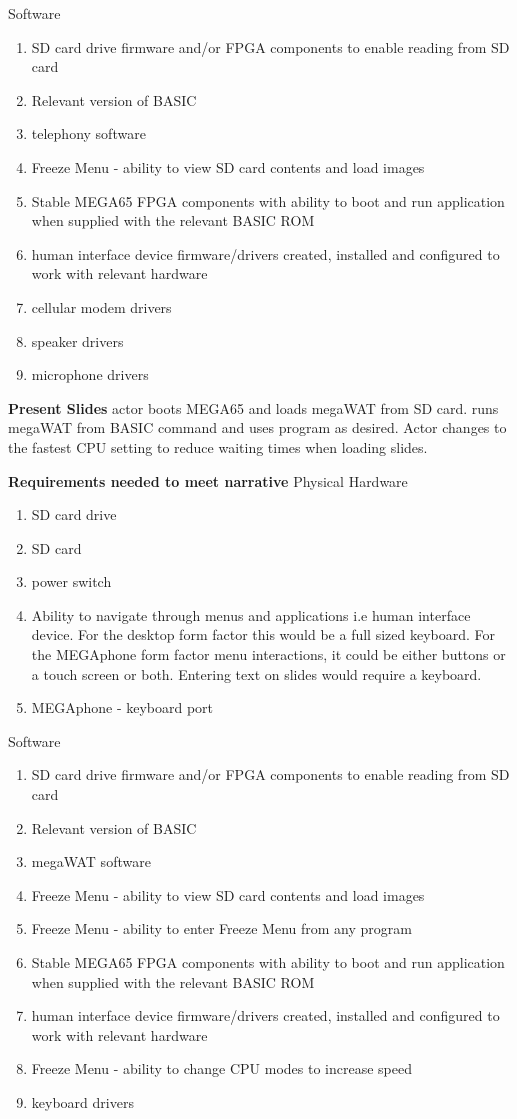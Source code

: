 Software
\begin{enumerate}
\item SD card drive firmware and/or FPGA components to enable reading from SD card
\item Relevant version of BASIC 
\item telephony software
\item Freeze Menu - ability to view SD card contents and load images
\item Stable MEGA65 FPGA components with ability to boot and run application when supplied with the relevant BASIC ROM
\item human interface device firmware/drivers created, installed and configured to work with relevant hardware
\item cellular modem drivers
\item speaker drivers
\item microphone drivers
\end{enumerate}

\textbf{Present Slides}
actor boots MEGA65 and loads megaWAT from SD card. runs megaWAT from BASIC command and uses program as desired. Actor changes to the fastest CPU setting to reduce waiting times when loading slides.

\textbf{Requirements needed to meet narrative}
Physical Hardware
\begin{enumerate}
\item SD card drive
\item SD card
\item power switch
\item Ability to navigate through menus and applications i.e human interface device. For the desktop form factor this would be a full sized keyboard. For the MEGAphone form factor menu interactions, it could be either buttons or a touch screen or both. Entering text on slides would require a keyboard.
\item MEGAphone - keyboard port
\end{enumerate}

Software
\begin{enumerate}
\item SD card drive firmware and/or FPGA components to enable reading from SD card
\item Relevant version of BASIC 
\item megaWAT software
\item Freeze Menu - ability to view SD card contents and load images
\item Freeze Menu - ability to enter Freeze Menu from any program
\item Stable MEGA65 FPGA components with ability to boot and run application when supplied with the relevant BASIC ROM
\item human interface device firmware/drivers created, installed and configured to work with relevant hardware
\item Freeze Menu - ability to change CPU modes to increase speed
\item keyboard drivers
\end{enumerate}

